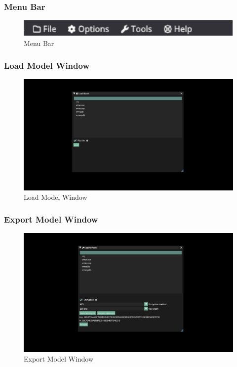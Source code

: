 \documentclass[11pt]{article}
\begin{document}
\subsubsection{Menu Bar}

\begin{figure}[h!]
  \centering
  \includegraphics[width=\textwidth]{images/menu_bar.png}
  \caption{Menu Bar}
  \label{fig:menu_bar}
\end{figure}


\subsubsection{Load Model Window}
\begin{figure}[h!]
  \centering
  \includegraphics[width=\textwidth]{images/load_model_window.png}
  \caption{Load Model Window}
  \label{fig:load_model_window}
\end{figure}


\subsubsection{Export Model Window}
\begin{figure}[h!]
  \centering
  \includegraphics[width=\textwidth]{images/encryption_system.png}
  \caption{Export Model Window}
  \label{fig:encryption_window}
\end{figure}
\end{document}
